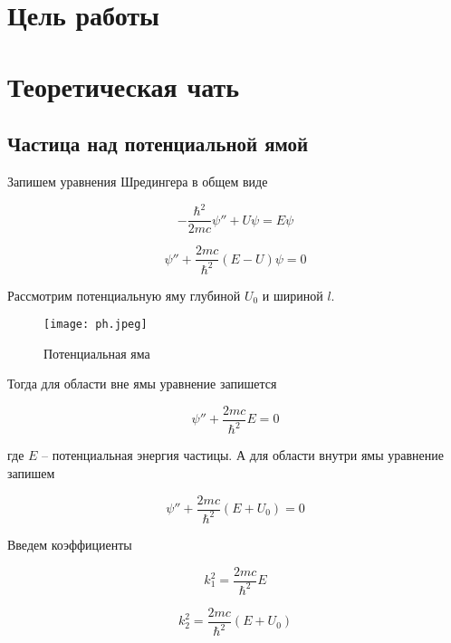 


    

    \section*{Цель работы}

    \section*{Теоретическая чать}

    \subsection*{Частица над потенциальной ямой}

    Запишем уравнения Шредингера в общем виде

    \begin{equation}
        -\frac{\hbar^2}{2mc} \psi'' + U \psi = E \psi
    \end{equation}

    \[ \psi'' + \frac{2mc}{\hbar^2}(E - U) \psi = 0 \]

    Рассмотрим потенциальную яму глубиной $U_0$ и шириной $l$.

    \begin{figure}
        \centering
        \texttt{[image: ph.jpeg]}
        \caption{Потенциальная яма}
        \label{fig:ph}
    \end{figure}

    Тогда для области вне ямы уравнение запишется

    \begin{equation}
        \psi'' + \frac{2mc}{\hbar^2} E = 0
    \end{equation}

    где $E$ -- потенциальная энергия частицы. А для области внутри ямы уравнение запишем

    \begin{equation}
        \psi'' + \frac{2mc}{\hbar^2}(E + U_0) = 0
    \end{equation}

    Введем коэффициенты

    \begin{equation}
        k_1^2 = \frac{2mc}{\hbar^2} E
    \end{equation}

    \begin{equation}
        k_2^2 = \frac{2mc}{\hbar^2}(E + U_0)
    \end{equation}


